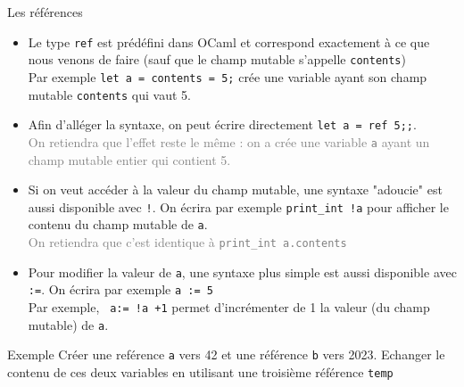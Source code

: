 \documentclass[10pt]{beamer}
\begin{document}
\begin{frame}{\Ctitle}{\stitle}
    \begin{block}{Les références}
        \begin{itemize}
            \item<1-> Le type \texttt{ref}  est prédéfini dans OCaml et correspond exactement à ce que nous venons de faire (sauf que le champ mutable s'appelle {\tt contents})\\
             Par exemple \texttt{let a = {contents = 5};} crée une variable ayant son champ mutable {\tt contents} qui vaut 5.
            \item<3-> Afin d'alléger la syntaxe, on peut écrire directement \texttt{let a = ref 5;;}. \\
            \textcolor{gray}{On retiendra que l'effet reste le même : on a crée une variable {\tt a} ayant un champ mutable entier qui contient 5.}
            \item<5-> Si on veut accéder à la valeur du champ mutable, une syntaxe "adoucie" est aussi disponible avec \textcolor{BrickRed}{\tt !}. On écrira par exemple  \texttt{print_int !a} pour afficher le contenu du champ mutable de {\tt a}. \\
            \textcolor{gray}{On retiendra que c'est identique à \texttt{print_int a.contents}}
            \item<7-> Pour modifier la valeur de {\tt a}, une syntaxe plus simple  est aussi disponible avec \textcolor{BrickRed}{\tt :=}. On écrira par exemple \texttt{a := 5}\\
             Par exemple, \texttt{ a:= !a +1} permet d'incrémenter de 1 la valeur (du champ mutable) de {\tt a}.
        \end{itemize}
    \end{block}
\end{frame}


\begin{frame}{\Ctitle}{\stitle}
    \begin{exampleblock}{Exemple}
        Créer une reférence {\tt a} vers 42 et une référence {\tt b} vers 2023. Echanger le contenu de ces deux variables en utilisant une troisième référence {\tt temp}
    \end{exampleblock}
\end{frame}
\end{document}
